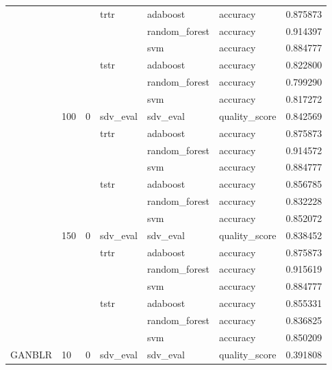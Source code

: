\begin{longtable}{llllllr}
\cline{4-7} \cline{5-7}
 &  &  & \multirow[t]{3}{*}{trtr} & adaboost & accuracy & 0.875873 \\
\cline{5-7}
 &  &  &  & random_forest & accuracy & 0.914397 \\
\cline{5-7}
 &  &  &  & svm & accuracy & 0.884777 \\
\cline{4-7} \cline{5-7}
 &  &  & \multirow[t]{3}{*}{tstr} & adaboost & accuracy & 0.822800 \\
\cline{5-7}
 &  &  &  & random_forest & accuracy & 0.799290 \\
\cline{5-7}
 &  &  &  & svm & accuracy & 0.817272 \\
\cline{2-7} \cline{3-7} \cline{4-7} \cline{5-7}
 & \multirow[t]{7}{*}{100} & \multirow[t]{7}{*}{0} & sdv_eval & sdv_eval & quality_score & 0.842569 \\
\cline{4-7} \cline{5-7}
 &  &  & \multirow[t]{3}{*}{trtr} & adaboost & accuracy & 0.875873 \\
\cline{5-7}
 &  &  &  & random_forest & accuracy & 0.914572 \\
\cline{5-7}
 &  &  &  & svm & accuracy & 0.884777 \\
\cline{4-7} \cline{5-7}
 &  &  & \multirow[t]{3}{*}{tstr} & adaboost & accuracy & 0.856785 \\
\cline{5-7}
 &  &  &  & random_forest & accuracy & 0.832228 \\
\cline{5-7}
 &  &  &  & svm & accuracy & 0.852072 \\
\cline{2-7} \cline{3-7} \cline{4-7} \cline{5-7}
 & \multirow[t]{7}{*}{150} & \multirow[t]{7}{*}{0} & sdv_eval & sdv_eval & quality_score & 0.838452 \\
\cline{4-7} \cline{5-7}
 &  &  & \multirow[t]{3}{*}{trtr} & adaboost & accuracy & 0.875873 \\
\cline{5-7}
 &  &  &  & random_forest & accuracy & 0.915619 \\
\cline{5-7}
 &  &  &  & svm & accuracy & 0.884777 \\
\cline{4-7} \cline{5-7}
 &  &  & \multirow[t]{3}{*}{tstr} & adaboost & accuracy & 0.855331 \\
\cline{5-7}
 &  &  &  & random_forest & accuracy & 0.836825 \\
\cline{5-7}
 &  &  &  & svm & accuracy & 0.850209 \\
\cline{1-7} \cline{2-7} \cline{3-7} \cline{4-7} \cline{5-7}
\multirow[t]{70}{*}{GANBLR} & \multirow[t]{14}{*}{10} & \multirow[t]{7}{*}{0} & sdv_eval & sdv_eval & quality_score & 0.391808 \\
\cline{4-7} \cline{5-7}

\end{longtable}
